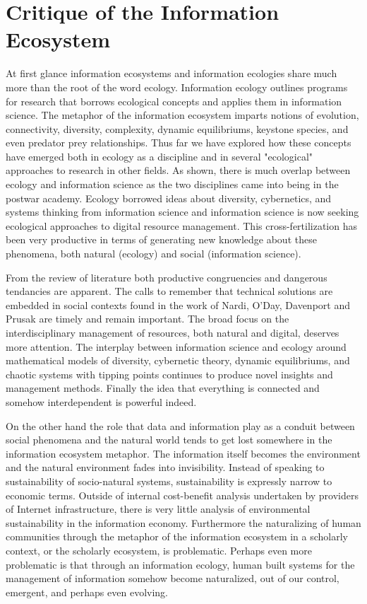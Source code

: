 \section{Critique of the Information Ecosystem}

At first glance information ecosystems and information ecologies share much more than the root of the word ecology. Information ecology outlines programs for research that borrows ecological concepts and applies them in information science.  The metaphor of the information ecosystem imparts notions of evolution, connectivity, diversity, complexity, dynamic equilibriums, keystone species, and even predator prey relationships. Thus far we have explored how these concepts have emerged both in ecology as a discipline and in several "ecological" approaches to research in other fields. As shown, there is much overlap between ecology and information science as the two disciplines came into being in the postwar academy. Ecology borrowed ideas about diversity, cybernetics, and systems thinking from information science and information science is now seeking ecological approaches to digital resource management. This cross-fertilization has been very productive in terms of generating new knowledge about these phenomena, both natural (ecology) and social (information science). 

From the review of literature both productive congruencies and dangerous tendancies are apparent. The calls to remember that technical solutions are embedded in social contexts found in the work of Nardi, O'Day, Davenport and Prusak are timely and remain important. The broad focus on the interdisciplinary management of resources, both natural and digital, deserves more attention. The interplay between information science and ecology around mathematical models of diversity, cybernetic theory, dynamic equilibriums, and chaotic systems with tipping points continues to produce novel insights and management methods. Finally the idea that everything is connected and somehow interdependent is powerful indeed.

On the other hand the role that data and information play as a conduit between social phenomena and the natural world tends to get lost somewhere in the information ecosystem metaphor. The information itself becomes the environment and the natural environment fades into invisibility. Instead of speaking to sustainability of socio-natural systems, sustainability is expressly narrow to economic terms. Outside of internal cost-benefit analysis undertaken by providers of Internet infrastructure, there is very little analysis of environmental sustainability in the information economy. Furthermore the naturalizing of human communities through the metaphor of the information ecosystem in a scholarly context, or the scholarly ecosystem, is problematic. Perhaps even more problematic is that through an information ecology, human built systems for the management of information somehow become naturalized, out of our control, emergent, and perhaps even evolving.


